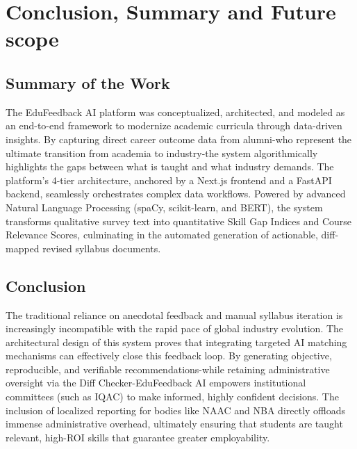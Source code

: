 \chapter{Conclusion, Summary and Future scope}
\label{Chapter:Conclusion}

\section{Summary of the Work}
The EduFeedback AI platform was conceptualized, architected, and modeled as an end-to-end framework to modernize academic curricula through data-driven insights. By capturing direct career outcome data from alumni-who represent the ultimate transition from academia to industry-the system algorithmically highlights the gaps between what is taught and what industry demands. The platform's 4-tier architecture, anchored by a Next.js frontend and a FastAPI backend, seamlessly orchestrates complex data workflows. Powered by advanced Natural Language Processing (spaCy, scikit-learn, and BERT), the system transforms qualitative survey text into quantitative Skill Gap Indices and Course Relevance Scores, culminating in the automated generation of actionable, diff-mapped revised syllabus documents.

\section{Conclusion}
The traditional reliance on anecdotal feedback and manual syllabus iteration is increasingly incompatible with the rapid pace of global industry evolution. The architectural design of this system proves that integrating targeted AI matching mechanisms can effectively close this feedback loop. By generating objective, reproducible, and verifiable recommendations-while retaining administrative oversight via the Diff Checker-EduFeedback AI empowers institutional committees (such as IQAC) to make informed, highly confident decisions. The inclusion of localized reporting for bodies like NAAC and NBA directly offloads immense administrative overhead, ultimately ensuring that students are taught relevant, high-ROI skills that guarantee greater employability.

